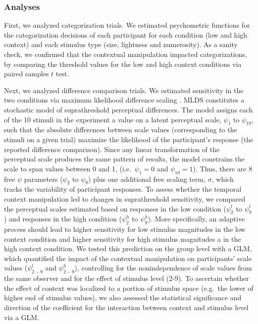 \documentclass[a4paper, nobind]{templates/ociamthesis}
\begin{document}
\hypertarget{analyses-5}{%
\subsubsection{Analyses}\label{analyses-5}}

First, we analyzed categorization trials. We estimated psychometric functions for the categorization decisions of each participant for each condition (low and high context) and each stimulus type (size, lightness and numerosity). As a sanity check, we confirmed that the contextual manipulation impacted categorizations, by comparing the threshold values for the low and high context conditions via paired samples \(t\) test.

Next, we analyzed difference comparison trials. We estimated sensitivity in the two conditions via maximum likelihood difference scaling \autocites[MLDS,][]{maloney2003,knoblauch2008}. MLDS constitutes a stochastic model of suprathreshold perceptual differences. The model assigns each of the 10 stimuli in the experiment a value on a latent perceptual scale, \(\psi_1\) to \(\psi_{10}\), such that the absolute differences between scale values (corresponding to the stimuli on a given trial) maximize the likelihood of the participant's response (the reported difference comparison). Since any linear transformation of the perceptual scale produces the same pattern of results, the model constrains the scale to span values between 0 and 1, (i.e.~\(\psi_1=0\) and \(\psi_{10}=1\)). Thus, there are 8 free \(\psi\) parameters (\(\psi_2\) to \(\psi_9\)) plus one additional free scaling term, \(\sigma\), which tracks the variability of participant responses. To assess whether the temporal context manipulation led to changes in suprathreshold sensitivity, we compared the perceptual scales estimated based on responses in the low condition (\(\psi_2^l\) to \(\psi_9^l\)) and responses in the high condition (\(\psi_2^h\) to \(\psi_9^h\)). More specifically, an adaptive process should lead to higher sensitivity for low stimulus magnitudes in the low context condition and higher sensitivity for high stimulus magnitudes a in the high context condition. We tested this prediction on the group level with a GLM, which quantified the impact of the contextual manipulation on participants' scale values (\(\psi_{2-9}^l\) and \(\psi_{2-9}^h\)), controlling for the nonindependence of scale values from the same observer and for the effect of stimulus level (2-9). To ascertain whether the effect of context was localized to a portion of stimulus space (e.g.~the lower of higher end of stimulus values), we also assessed the statistical significance and direction of the coefficient for the interaction between context and stimulus level via a GLM.
\end{document}
